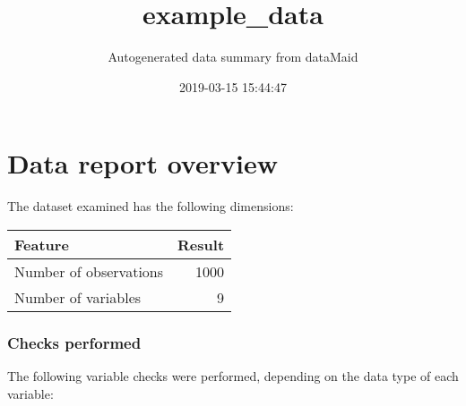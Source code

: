 \documentclass[]{report}
\title{example\_data}
\subtitle{Autogenerated data summary from dataMaid}
\author{}
\date{2019-03-15 15:44:47}
\begin{document}
\maketitle

\chapter{Data report overview}\label{data-report-overview}

The dataset examined has the following dimensions:

\begin{longtable}[]{@{}lr@{}}
\toprule
\begin{minipage}[b]{0.33\columnwidth}\raggedright\strut
Feature\strut
\end{minipage} & \begin{minipage}[b]{0.10\columnwidth}\raggedleft\strut
Result\strut
\end{minipage}\tabularnewline
\midrule
\endhead
\begin{minipage}[t]{0.33\columnwidth}\raggedright\strut
Number of observations\strut
\end{minipage} & \begin{minipage}[t]{0.10\columnwidth}\raggedleft\strut
1000\strut
\end{minipage}\tabularnewline
\begin{minipage}[t]{0.33\columnwidth}\raggedright\strut
Number of variables\strut
\end{minipage} & \begin{minipage}[t]{0.10\columnwidth}\raggedleft\strut
9\strut
\end{minipage}\tabularnewline
\bottomrule
\end{longtable}

\subsection{Checks performed}\label{checks-performed}

The following variable checks were performed, depending on the data type
of each variable:
\end{document}
